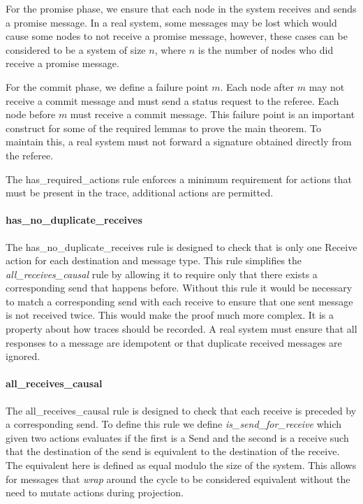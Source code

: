 \documentclass[runningheads]{llncs}
\begin{document}
For the promise phase, we ensure that each node in the system receives and sends a promise message. In a real system, some messages may be lost which would cause some nodes to not receive a promise message, however, these cases can be considered to be a system of size $n$, where $n$ is the number of nodes who did receive a promise message. 

For the commit phase, we define a failure point $m$. Each node after $m$ may not receive a commit message and must send a status request to the referee. Each node before $m$ must receive a commit message. This failure point is an important construct for some of the required lemmas to prove the main theorem. To maintain this, a real system must not forward a signature obtained directly from the referee. 

The has\_required\_actions rule enforces a minimum requirement for actions that must be present in the trace, additional actions are permitted.

\paragraph{has\_no\_duplicate\_receives}
The has\_no\_duplicate\_receives rule is designed to check that is only one Receive action for each destination and message type. This rule simplifies the \emph{all\_receives\_causal} rule by allowing it to require only that there exists a corresponding send that happens before. Without this rule it would be necessary to match a corresponding send with each receive to ensure that one sent message is not received twice. This would make the proof much more complex. It is a property about how traces should be recorded. A real system must ensure that all responses to a message are idempotent or that duplicate received messages are ignored. 

\paragraph{all\_receives\_causal}
The all\_receives\_causal rule is designed to check that each receive is preceded by a corresponding send. To define this rule we define \sloppy \emph{is\_send\_for\_receive} which given two actions evaluates if the first is a Send and the second is a receive such that the destination of the send is equivalent to the destination of the receive. The equivalent here is defined as equal modulo the size of the system. This allows for messages that \emph{wrap} around the cycle to be considered equivalent without the need to mutate actions during projection. 
\end{document}
